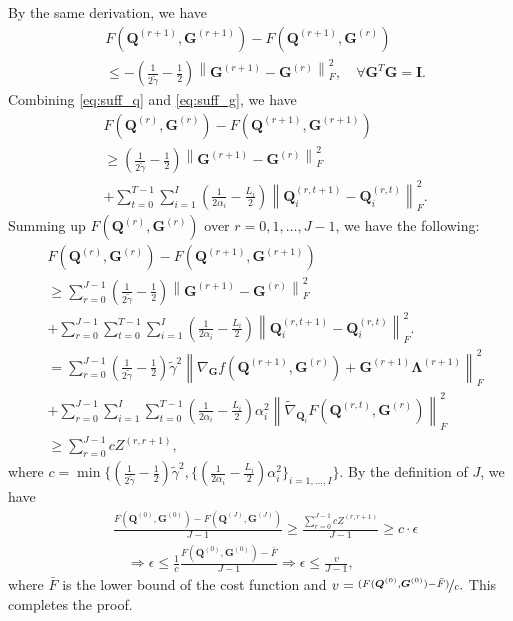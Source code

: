 \documentclass[10pt,journal]{IEEEtran}
\newcommand{\G}{\boldsymbol{G}}
\newcommand{\Q}{\boldsymbol{Q}}
\begin{document}
By the same derivation, we have
\begin{equation}\label{eq:suff_g}
\begin{aligned}
& F(\Q^{(r+1)},\G^{(r+1)}) - F(\Q^{(r+1)},\G^{(r)}) \\
& \leq -\left( \frac{1}{2\tilde{\gamma}} - \frac{1}{2} \right)\left\|\G^{(r+1)}-\G^{(r)}\right\|_F^2,\quad \forall \G^T\G ={\bm I}.
\end{aligned}
\end{equation}
Combining \eqref{eq:suff_q} and \eqref{eq:suff_g}, we have
\begin{equation}\label{eq:suff}
\begin{aligned}
&F(\Q^{(r)},\G^{(r)}) - F(\Q^{(r+1)},\G^{(r+1)}) \\ &\geq \left( \frac{1}{2\tilde{\gamma}} - \frac{1}{2} \right)\left\|\G^{(r+1)}-\G^{(r)}\right\|_F^2\\
& +\sum_{t=0}^{T-1}\sum_{i=1}^I\left( \frac{1}{2\alpha_i} - \frac{L_i}{2} \right)\left\|\Q_i^{(r,t+1)}-\Q_i^{(r,t)}\right\|_F^2.
\end{aligned}
\end{equation}
Summing up $F(\Q^{(r)},\G^{(r)})$ over $r=0,1,\ldots,J-1$, we have
the following:
\begin{align}\label{eq:Zr}
&F(\Q^{(r)},\G^{(r)}) -F(\Q^{(r+1)},\G^{(r+1)}) \nonumber\\
&\geq \sum_{r=0}^{J-1} \left( \frac{1}{2\tilde{\gamma}} - \frac{1}{2} \right)\left\|\G^{(r+1)}-\G^{(r)}\right\|_F^2\nonumber\\
& + \sum_{r=0}^{J-1}\sum_{t=0}^{T-1}\sum_{i=1}^I\left( \frac{1}{2\alpha_i} - \frac{L_i}{2} \right)\left\|\Q_i^{(r,t+1)}-\Q_i^{(r,t)}\right\|_F^2.\nonumber\\
& = \sum_{r=0}^{J-1} \left( \frac{1}{2\tilde{\gamma}} - \frac{1}{2} \right)\tilde{\gamma}^2\left\|\nabla_{\G}f(\Q^{(r+1)},\G^{(r)})+\G^{(r+1)}{\bm \Lambda}^{(r+1)}\right\|_F^2 \nonumber\\
&+  \sum_{r=0}^{J-1}\sum_{i=1}^I\sum_{t=0}^{T-1}\left( \frac{1}{2\alpha_i} - \frac{L_i}{2} \right) \alpha_{i}^2\left\|\tilde\nabla_{\Q_i}F(\Q^{(r,t)},\G^{(r)}) \right\|_F^2\nonumber\\
&\geq  \sum_{r=0}^{J-1} c Z^{(r,r+1)},
\end{align}
where
$c = \min\{ ( \frac{1}{2\tilde{\gamma}} - \frac{1}{2} )\tilde{\gamma}^2, \{( \frac{1}{2\alpha_i} - \frac{L_i}{2} ) \alpha_i^2\}_{i=1,\ldots,I} \}.$
By the definition of $J$, we have
\begin{align*}
&\frac{F(\Q^{(0)},\G^{(0)}) - F(\Q^{(J)},\G^{(J)})}{J-1}\geq \frac{\sum_{r=0}^{J-1} c Z^{(r,r+1)}}{J-1}\geq c \cdot \epsilon\\
&\quad\Rightarrow  \epsilon \leq \frac{1}{c} \frac{F(\Q^{(0)},\G^{(0)}) - \bar{F}}{J-1}\Rightarrow  \epsilon \leq \frac{v}{J-1},
\end{align*} 
where $\bar{F}$ is the lower bound of the cost function and
$v = \nicefrac{(F(\Q^{(0)},\G^{(0)}) - \bar{F})}{c}.$
This completes the proof. 
\end{document}
